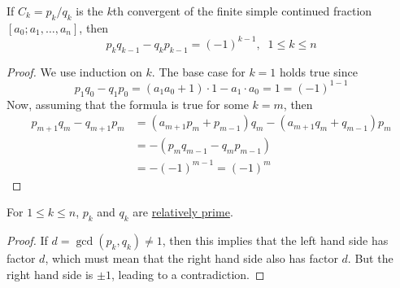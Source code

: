 \documentclass{article}
\newcounter{theorem}[section]
\newcounter{example}[section]
\begin{document}
\begin{theorem}
  \label{thm:cross-difference-identity-for-convergents}
If $C_k = p_k / q_k$ is the $k$th convergent of the finite simple continued fraction $[a_0; a_1, \ldots, a_n]$, then 
\begin{equation}
  p_k q_{k-1} - q_k p_{k-1} = (-1)^{k-1}, \;\; 1\leq k \leq n
\end{equation}
\end{theorem}
\begin{proof}
We use induction on $k$. The base case for $k=1$ holds true since
\begin{equation}
  p_1 q_0 - q_1 p_0 = (a_1 a_0 + 1) \cdot 1 - a_1 \cdot a_0 = 1 = (-1)^{1-1}
\end{equation}
Now, assuming that the formula is true for some $k = m$, then 
\begin{align*}
    p_{m+1} q_m - q_{m+1} p_m & = (a_{m+1} p_m + p_{m-1}) q_m - (a_{m+1} q_m + q_{m-1}) p_m \\
    & = - (p_m q_{m-1} - q_m p_{m-1}) \\
    & = - (-1)^{m-1} = (-1)^m
\end{align*}
\end{proof}

\begin{corollary}
  \label{thm:numerator-and-denominator-of-a-convergent-are}
For $1 \leq k \leq n$, $p_k$ and $q_k$ are \hyperref[def:relatively-prime]{relatively prime}. 
\end{corollary}
\begin{proof}
If $d = \gcd(p_k, q_k) \neq 1$, then this implies that the left hand side has factor $d$, which must mean that the right hand side also has factor $d$. But the right hand side is $\pm 1$, leading to a contradiction. 
\end{proof}

\end{document}
